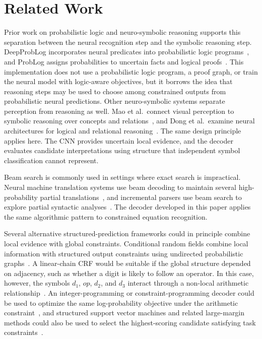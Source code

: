 \documentclass[12pt]{article}
\newcounter{algorithm}
\begin{document}
\section{Related Work}
Prior work on probabilistic logic and neuro-symbolic reasoning supports this separation between the neural recognition step and the symbolic reasoning step. DeepProbLog incorporates neural predicates into probabilistic logic programs~\cite{manhaeve2018}, and ProbLog assigns probabilities to uncertain facts and logical proofs~\cite{deraedt2007}. This implementation does not use a probabilistic logic program, a proof graph, or train the neural model with logic-aware objectives, but it borrows the idea that reasoning steps may be used to choose among constrained outputs from probabilistic neural predictions. Other neuro-symbolic systems separate perception from reasoning as well. Mao et al.\ connect visual perception to symbolic reasoning over concepts and relations~\cite{mao2019}, and Dong et al.\ examine neural architectures for logical and relational reasoning~\cite{dong2019}. The same design principle applies here. The CNN provides uncertain local evidence, and the decoder evaluates candidate interpretations using structure that independent symbol classification cannot represent.

Beam search is commonly used in settings where exact search is impractical. Neural machine translation systems use beam decoding to maintain several high-probability partial translations~\cite{sutskever2014,bahdanau2015}, and incremental parsers use beam search to explore partial syntactic analyses~\cite{collins2004}. The decoder developed in this paper applies the same algorithmic pattern to constrained equation recognition.

Several alternative structured-prediction frameworks could in principle combine local evidence with global constraints. Conditional random fields combine local information with structured output constraints using undirected probabilistic graphs~\cite{lafferty2001}. A linear-chain CRF would be suitable if the global structure depended on adjacency, such as whether a digit is likely to follow an operator. In this case, however, the symbols $d_1$, $op$, $d_2$, and $d_3$ interact through a non-local arithmetic relationship~\cite{kschischang2001}. An integer-programming or constraint-programming decoder could be used to optimize the same log-probability objective under the arithmetic constraint~\cite{roth2004}, and structured support vector machines and related large-margin methods could also be used to select the highest-scoring candidate satisfying task constraints~\cite{tsochantaridis2005}.
\end{document}
